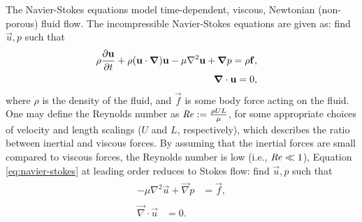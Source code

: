         The Navier-Stokes equations model time-dependent, viscous, Newtonian (non-porous) fluid flow. The incompressible Navier-Stokes equations are given as: find $\vec{u}, p$ such that
        \begin{subequations}
            \begin{align}
                \begin{split}
                    \rho \pdv{\vec{u}}{t} + \rho (\vec{u} \cdot \vec{\nabla}) \vec{u} - \mu \nabla^2 \vec{u} + \vec{\nabla} p & = \rho \vec{f},
                \end{split}\\
                \begin{split}
                    \vec{\nabla} \cdot \vec{u} & = 0,
                \end{split}%
            \end{align}%
            \label{eq:navier-stokes}%
        \end{subequations}%
        where $\rho$ is the density of the fluid, and $\vec{f}$ is some body force acting on the fluid. One may define the Reynolds number as $\operatorname{\mbox{\textit{Re}}} := \frac{\rho U L}{\mu}$, for some appropriate choices of velocity and length scalings ($U$ and $L$, respectively), which describes the ratio between inertial and viscous forces. By assuming that the inertial forces are small compared to viscous forces, the Reynolds number is low (i.e., $\operatorname{\mbox{\textit{Re}}} \ll 1$), Equation \eqref{eq:navier-stokes} at leading order reduces to Stokes flow: find $\vec{u}, p$ such that
        \begin{subequations}
            \begin{align}
                \begin{split}
                    - \mu \nabla^2 \vec{u} + \vec{\nabla} p & = \vec{f},
                \end{split}\\
                \begin{split}
                    \vec{\nabla} \cdot \vec{u} & = 0.
                \end{split}
            \end{align}
            \label{eq:stokes-flow}
        \end{subequations}
        
